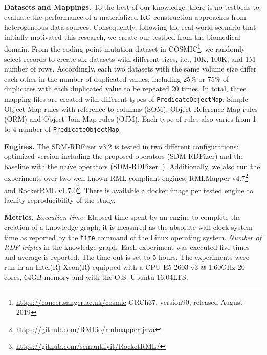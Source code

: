 \noindent\textbf{Datasets and Mappings.} To the best of our knowledge, there is no testbeds to evaluate the performance of a materialized KG construction approaches from heterogeneous data sources. Consequently, following the real-world scenario that initially motivated this research, we create our testbed from the biomedical domain. From the coding point mutation dataset in COSMIC\footnote{\url{https://cancer.sanger.ac.uk/cosmic} GRCh37, version90, released August 2019}, we randomly select records to create six datasets with different sizes, i.e., 10K, 100K, and 1M number of rows. Accordingly, each two datasets with the same volume size differ each other in the number of duplicated values; including 25\% or 75\% of duplicates with each duplicated value to be repeated 20 times. In total, three mapping files are created with different types of \verb|PredicateObjectMap|: Simple Object Map rules with reference to columns (SOM), Object Reference Map rules (ORM) and Object Join Map rules (OJM). Each type of rules also varies from 1 to 4 number of \verb|PredicateObjectMap|.

\noindent\textbf{Engines.} The SDM-RDFizer v3.2 is tested in two different configurations: optimized version including the proposed operators (SDM-RDFizer) and the baseline with the na\"ive operators (SDM-RDFizer$^-$). Additionally, we also run the experiments over two well-known RML-compliant engines: RMLMapper v4.7\footnote{\url{https://github.com/RMLio/rmlmapper-java}} and RocketRML v1.7.0\footnote{\url{https://github.com/semantifyit/RocketRML/}}. There is available a docker image per tested engine to facility reproducibility of the study.

\noindent\textbf{Metrics.} \textit{Execution time:} Elapsed time spent by an engine to complete the creation of a knowledge graph; it is measured as the absolute wall-clock system time as reported by the \verb|time| command of the Linux operating system. \textit{Number of RDF triples} in the knowledge graph. Each experiment was executed five times and average is reported. The time out is set to 5 hours. The experiments were run in an Intel(R) Xeon(R) equipped with a CPU E5-2603 v3 @ 1.60GHz 20 cores, 64GB memory and with the O.S. Ubuntu 16.04LTS.


